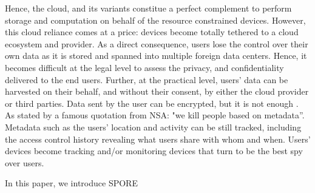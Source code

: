 Hence, the cloud, and its variants constitue a perfect complement
to perform storage and computation on behalf of the resource
constrained devices. However, this cloud reliance comes at a price:
devices become totally tethered to a cloud ecosystem and provider. As
a direct consequence, users lose the control over their own data as it is
stored and spanned into multiple foreign data centers. Hence, it becomes difficult at 
the legal level to assess the privacy, and
confidentiality delivered to the end users. Further, at the practical
level, users' data can be harvested on their behalf, and without their
consent, by either the cloud provider or third parties.
Data sent by the user can be encrypted, but it is not enough
\cite{granick_2017, HooffLZZ15}. As stated by a famous quotation from
NSA: "we kill people based on metadata''. Metadata such as the users'
location and activity can be still tracked, including the access
control history revealing what users share with whom and when.
Users’ devices become tracking and/or monitoring devices that turn to
be the best spy over users. 

In this paper, we introduce SPORE
